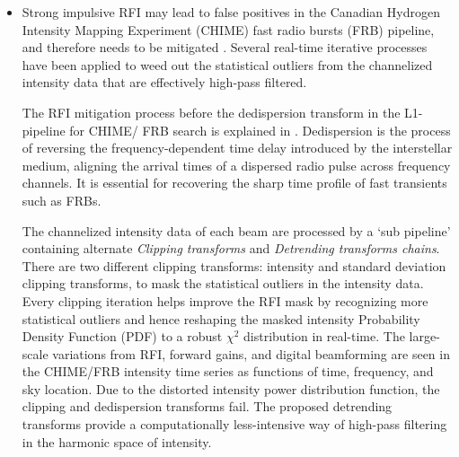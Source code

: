 \begin{itemize}
\item Strong impulsive RFI may lead to false positives in the Canadian Hydrogen Intensity Mapping Experiment (CHIME) fast radio bursts (FRB) pipeline, and therefore needs to be mitigated \citep{chime_frb_rfi_2023}. Several real-time iterative processes have been applied to weed out the statistical outliers from the channelized intensity data that are effectively high-pass filtered.

The RFI mitigation process before the dedispersion transform in the L1-pipeline for CHIME/ FRB search is explained in \citep{chime_frb_rfi_2023}. Dedispersion is the process of reversing the frequency-dependent time delay introduced by the interstellar medium, aligning the arrival times of a dispersed radio pulse across frequency channels. It is essential for recovering the sharp time profile of fast transients such as FRBs.

The channelized intensity data of each beam are processed by a `sub pipeline' containing alternate \textit{Clipping transforms} and \textit{Detrending transforms chains}. There are two different clipping transforms: intensity and standard deviation clipping transforms, to mask the statistical outliers in the intensity data. Every clipping iteration helps
improve the RFI mask by recognizing more statistical outliers and hence reshaping the masked intensity Probability Density Function (PDF) to a robust $\chi^2$ distribution in real-time. The large-scale variations from RFI, forward gains, and digital beamforming are seen in the CHIME/FRB intensity time series as functions of time, frequency, and sky location. Due to the distorted intensity power distribution function, the clipping and dedispersion transforms fail. The proposed detrending transforms provide a computationally less-intensive way of high-pass filtering in the harmonic space of intensity.


\end{itemize}
